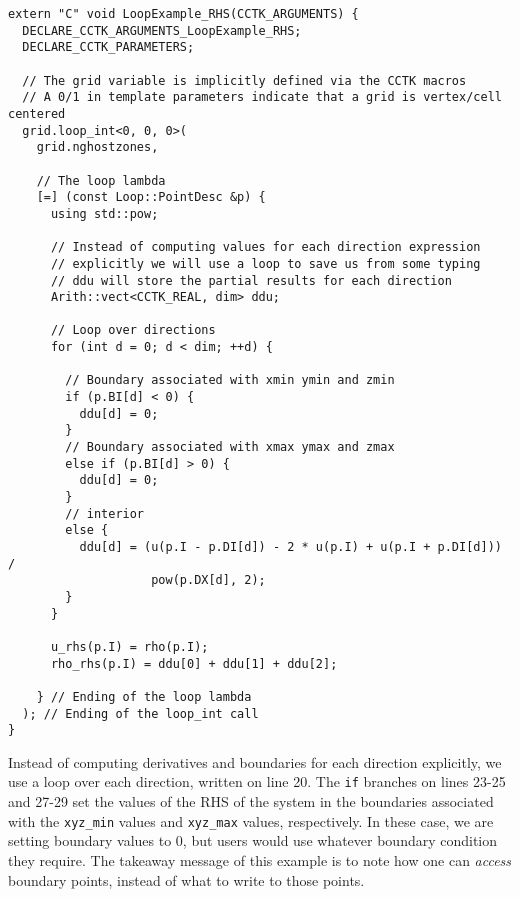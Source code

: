 \begin{lstlisting}
extern "C" void LoopExample_RHS(CCTK_ARGUMENTS) {
  DECLARE_CCTK_ARGUMENTS_LoopExample_RHS;
  DECLARE_CCTK_PARAMETERS;

  // The grid variable is implicitly defined via the CCTK macros
  // A 0/1 in template parameters indicate that a grid is vertex/cell centered
  grid.loop_int<0, 0, 0>(
    grid.nghostzones,

    // The loop lambda
    [=] (const Loop::PointDesc &p) {
      using std::pow;

      // Instead of computing values for each direction expression
      // explicitly we will use a loop to save us from some typing
      // ddu will store the partial results for each direction
      Arith::vect<CCTK_REAL, dim> ddu;
      
      // Loop over directions
      for (int d = 0; d < dim; ++d) {
        
        // Boundary associated with xmin ymin and zmin
        if (p.BI[d] < 0) {
          ddu[d] = 0;
        }
        // Boundary associated with xmax ymax and zmax
        else if (p.BI[d] > 0) {
          ddu[d] = 0;
        }
        // interior
        else {
          ddu[d] = (u(p.I - p.DI[d]) - 2 * u(p.I) + u(p.I + p.DI[d])) /
                    pow(p.DX[d], 2);
        }
      }

      u_rhs(p.I) = rho(p.I);
      rho_rhs(p.I) = ddu[0] + ddu[1] + ddu[2];

    } // Ending of the loop lambda
  ); // Ending of the loop_int call
}
\end{lstlisting}

Instead of computing derivatives and boundaries for each direction explicitly, we use a loop over each direction, written on line 20. The \texttt{if} branches on lines 23-25 and 27-29 set the values of the RHS of the system in the boundaries associated with the \texttt{xyz\_min} values and \texttt{xyz\_max} values, respectively. In these case, we are setting boundary values to $0$, but users would use whatever boundary condition they require. The takeaway message of this example is to note how one can \textit{access} boundary points, instead of what to write to those points.